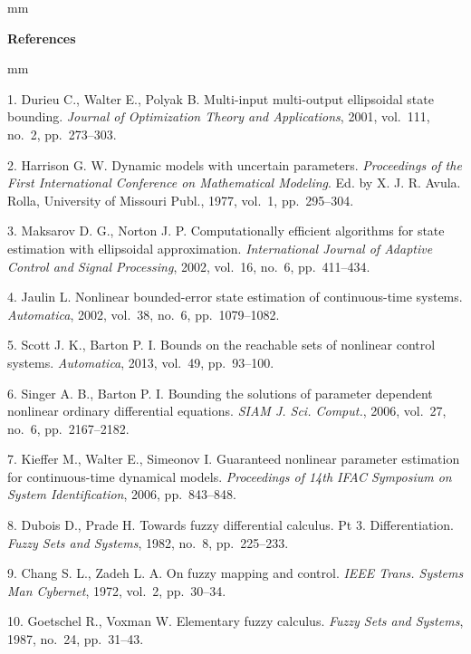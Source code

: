 

{\small



 mm

\noindent \textbf{References} }

 mm

{\footnotesize



1. Durieu C., Walter E., Polyak B. Multi-input multi-output ellipsoidal state bounding. \emph{Journal of Optimization Theory and
Applications}, 2001, vol.~111, no.~2, pp.~273--303.

2. Harrison G. W. Dynamic models with uncertain parameters. \emph{Proceedings of the First International Conference on Mathematical Modeling}.  Ed. by X. J. R. Avula. Rolla, University of Missouri Publ., 1977, vol.~1, pp.~295--304.

3. Maksarov D. G., Norton J. P.  Computationally efficient algorithms for state estimation with ellipsoidal approximation. \emph{International Journal of Adaptive Control and Signal Processing}, 2002, vol.~16, no.~6, pp.~411--434.

4. Jaulin L. Nonlinear bounded-error state estimation of continuous-time systems. \emph{Automatica}, 2002, vol.~38, no.~6, pp.~1079--1082.

5. Scott J. K., Barton P. I. {Bounds on the reachable sets of nonlinear control systems}. \emph{Automatica}, 2013, vol.~49, pp.~93--100.

6. Singer A. B., Barton P. I. {Bounding the solutions of parameter dependent nonlinear ordinary differential equations}. \emph{SIAM J. Sci. Comput.}, 2006, vol.~27, no.~6, pp.~2167--2182.

7. Kieffer M., Walter E., Simeonov I. Guaranteed nonlinear parameter
estimation for continuous-time dynamical models. \emph{Proceedings of 14th IFAC Symposium on System Identification}, 2006, pp.~843--848.

8. Dubois D., Prade H. Towards fuzzy differential calculus. Pt 3. Differentiation. \emph{Fuzzy Sets and Systems}, 1982, no.~8, pp.~225--233.

9. Chang S. L., Zadeh L. A. On fuzzy mapping and control. \emph{IEEE Trans. Systems Man Cybernet}, 1972, vol.~2, pp.~30--34.

10. Goetschel R., Voxman W. {Elementary fuzzy calculus}. \emph{Fuzzy Sets and Systems}, 1987, no.~24, pp.~31--43.

}
